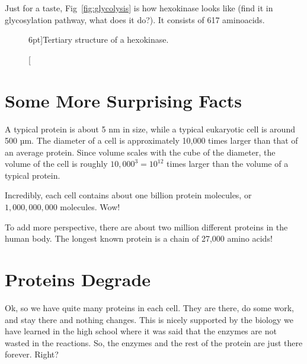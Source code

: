 Just for a taste, Fig~\ref{fig:glycolysis} is how hexokinase looks like (find it in glycosylation pathway, what does it do?). It consists of 617 aminoacids.

\begin{figure}
    \caption[][6pt]{Tertiary structure of a hexokinase.}
    \label{fig:hexokinase}
\end{figure}

\section{Some More Surprising Facts}

A typical protein is about 5 nm in size, while a typical eukaryotic cell is around 500 µm. The diameter of a cell is approximately 10,000 times larger than that of an average protein. Since volume scales with the cube of the diameter, the volume of the cell is roughly $10,000^3 = 10^{12}$ times larger than the volume of a typical protein.

Incredibly, each cell contains about one billion protein molecules, or $1,000,000,000$ molecules. Wow!

To add more perspective, there are about two million different proteins in the human body. The longest known protein is a chain of 27,000 amino acids!

\section{Proteins Degrade}

Ok, so we have quite many proteins in each cell. They are there, do some work, and stay there and nothing changes. This is nicely supported by the biology we have learned in the high school where it was said that the enzymes are not wasted in the reactions. So, the enzymes and the rest of the protein are just there forever. Right?

